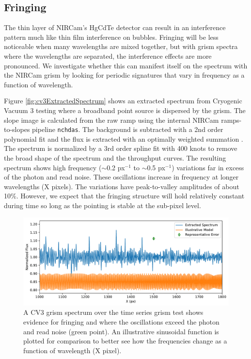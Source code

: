 \documentclass{aastex62}
\begin{document}
\subsection{Fringing}

The thin layer of NIRCam's HgCdTe detector can result in an interference pattern much like thin film interference on bubbles.
Fringing will be less noticeable when many wavelengths are mixed together, but with grism spectra where the wavelengths are separated, the interference effects are more pronounced.
We investigate whether this can manifest itself on the spectrum with the NIRCam grism by looking for periodic signatures that vary in frequency as a function of wavelength.

Figure \ref{fig:cv3ExtractedSpectrum} shows an extracted spectrum from Cryogenic Vacuum 3 testing where a broadband point source is dispersed by the grism.
The slope image is calculated from the raw ramp using the internal NIRCam ramps-to-slopes pipeline \texttt{nchdas}.
The background is subtracted with a 2nd order polynomial fit and the flux is extracted with an optimally weighted summation \citep[e.g.][]{horne1986optimalE}.
The spectrum is normalized by a 3rd order spline fit with 400 knots to remove the broad shape of the spectrum and the throughput curves.
The resulting spectrum shows high frequency ($\sim$0.2 px$^{-1}$ to $\sim$0.5 px$^{-1}$) variations far in excess of the photon and read noise.
These oscillations increase in frequency at longer wavelengths (X pixels).
The variations have peak-to-valley amplitudes of about 10\%.
However, we expect that the fringing structure will hold relatively constant during time so long as the pointing is stable at the sub-pixel level.

\begin{figure}[!hbtp]
\centering
\includegraphics[width=.99\columnwidth]{fringing_grism_cv3.pdf}
\caption{A CV3 grism spectrum over the time series grism test shows evidence for fringing and where the oscillations exceed the photon and read noise (green point).
An illustrative sinusoidal function is plotted for comparison to better see how the frequencies change as a function of wavelength (X pixel).
}\label{fig:CV3GrismSpecFringing}
\end{figure}
\end{document}
